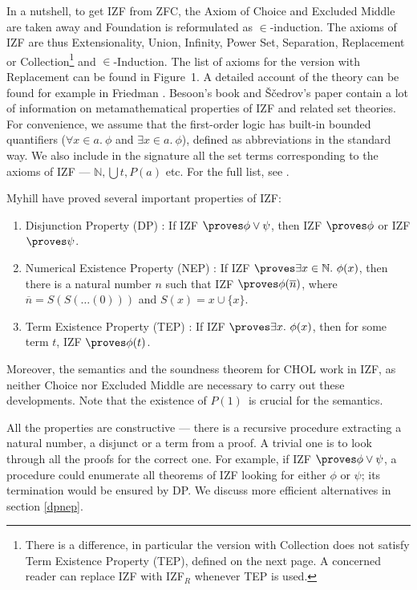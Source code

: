 \documentclass{LMCS}
\newcommand{\ov}[1]{\ensuremath{\overline{#1}}}
\newcommand{\nat}{\ensuremath{\mathbb{N}}}
\newcommand{\p}{\proves}
\newcommand{\Prop}{\ensuremath{P(1)}}
\begin{document}
In a nutshell, to get IZF from ZFC, the Axiom of Choice and Excluded Middle
are taken away and Foundation is reformulated as $\in$-induction. The axioms of IZF are thus Extensionality, Union, Infinity, 
Power Set, Separation, Replacement or Collection\footnote{There is a
difference, in particular the version with Collection does not satisfy Term
Existence Property (TEP), defined on the next page. A concerned reader can replace IZF with IZF$_R$ whenever TEP is used. }
and $\in$-Induction. The list of axioms for the version with Replacement can be found in
Figure~1. 
A detailed account of the theory can be found for
example in Friedman \cite{Fri73}. Besoon's book \cite{Bee85} and
\v{S}\v{c}edrov's paper \cite{Sce85} contain a lot of information on metamathematical properties of IZF and related set theories. 
For convenience, we assume that the first-order logic has built-in bounded quantifiers
($\forall x \in a.\ \phi$ and $\exists x \in a.\ \phi$), defined as
abbreviations in the standard way. We also include in the signature all the
set terms corresponding to the axioms of IZF --- $\nat, \bigcup t, P(a)$ etc.
For the full list, see \cite{jalmcs07}. 


Myhill \cite{Myhill73} have proved several important properties of IZF:
\begin{enumerate}[$\bullet$]
\item Disjunction Property (DP) : If IZF $\p \phi \lor \psi$, then IZF $\p
\phi$ or IZF $\p \psi$.
\item Numerical Existence Property (NEP) : If IZF $\p \exists x \in \nat.\
\phi(x)$, then there is a natural number $n$ such that IZF $\p
\phi(\ov{n})$, where $\ov{n} = S(S({\ldots}(0)))$ and $S(x) = x \cup \{ x
\}$. 
\item Term Existence Property (TEP) : If IZF $\p \exists x.\ \phi(x)$, then
for some term $t$, IZF $\p \phi(t)$. 
\end{enumerate}

Moreover, the semantics and the soundness theorem for CHOL work in IZF, as
neither Choice nor Excluded Middle are necessary to carry out these
developments. Note that the existence of \Prop\ is crucial for the semantics. 

All the properties are constructive --- there is a
recursive procedure extracting a natural number, a disjunct or a term from a proof.
A trivial one is to look through all the proofs for the correct one. For
example, if IZF $\p \phi \lor \psi$, a procedure could enumerate all theorems
of IZF looking for either $\phi$ or $\psi$; its termination would be ensured by DP. 
We discuss more efficient alternatives in section \ref{dpnep}.
\end{document}
